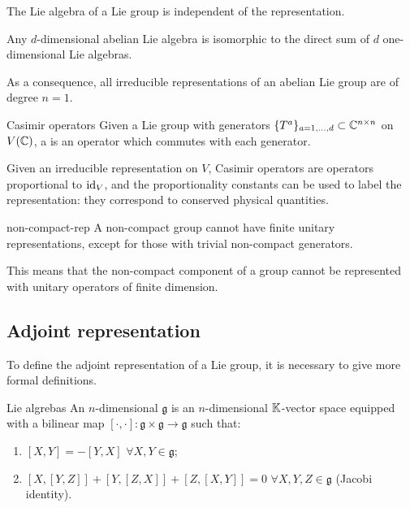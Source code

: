 \begin{proposition}{}{}
  The Lie algebra of a Lie group is independent of the representation.
\end{proposition}

\begin{proposition}{}{}
  Any $ d $-dimensional abelian Lie algebra is isomorphic to the direct sum of $ d $ one-dimensional Lie algebras.
\end{proposition}

As a consequence, all irreducible representations of an abelian Lie group are of degree $ n = 1 $.

\begin{definition}{Casimir operators}{}
  Given a Lie group with generators $ \{T^a\}_{a = 1, \dots, d} \subset \mathbb{C}^{n \times n} $ on $ V(\mathbb{C}) $, a  is an operator which commutes with each generator.
\end{definition}

Given an irreducible representation on $ V $, Casimir operators are operators proportional to $ \operatorname{id}_V $, and the proportionality constants can be used to label the representation: they correspond to conserved physical quantities.

\begin{proposition}{}{non-compact-rep}
  A non-compact group cannot have finite unitary representations, except for those with trivial non-compact generators.
\end{proposition}

This means that the non-compact component of a group cannot be represented with unitary operators of finite dimension.

\subsection{Adjoint representation}

To define the adjoint representation of a Lie group, it is necessary to give more formal definitions.

\begin{definition}{Lie algrebas}{}
  An $ n $-dimensional  $ \mathfrak{g} $ is an $ n $-dimensional $ \mathbb{K} $-vector space equipped with a bilinear map $ [\cdot,\cdot] : \mathfrak{g} \times \mathfrak{g} \rightarrow \mathfrak{g} $ such that:
  \begin{enumerate}
    \item $ [X,Y] = - [Y,X] \,\,\forall X,Y \in \mathfrak{g} $;
    \item $ [X,[Y,Z]] + [Y,[Z,X]] + [Z,[X,Y]] = 0 \,\,\forall X,Y,Z \in \mathfrak{g} $ (Jacobi identity).
  \end{enumerate}
\end{definition}

